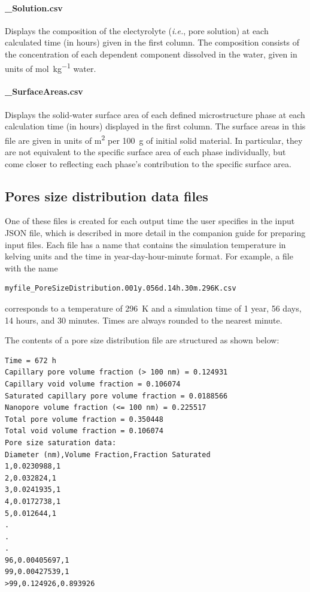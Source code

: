 \documentclass{article}
\begin{document}
\paragraph{\_Solution.csv} Displays the composition of the electyrolyte
(\textit{i.e.}, pore solution) at each calculated time (in hours) given in
the first column. The composition consists of the concentration of each
dependent component dissolved in the water, given in units of
\unit{\mole\per\kilo\gram} water.

\paragraph{\_SurfaceAreas.csv} Displays the solid-water surface
area of each defined microstructure phase at each calculation time (in hours)
displayed in the first column. The surface areas in this file are given
in units of \unit{\meter\squared} per \qty{100}{\gram} of initial solid
material. In particular, they are not equivalent to the specific surface
area of each phase individually, but come closer to reflecting each phase's
contribution to the specific surface area.

\subsection{Pores size distribution data files}
One of these files is created for each output time the user specifies in the
input JSON file, which is described in more detail in the companion guide
for preparing input files. Each file has a name that contains the
simulation temperature in kelving units and the time in year-day-hour-minute format.
For example, a file with the name
\scriptsize{
	\begin{lstlisting}
myfile_PoreSizeDistribution.001y.056d.14h.30m.296K.csv
\end{lstlisting}
}
\normalsize{ }
corresponds to a temperature of \qty{296}{\kelvin} and
a simulation time of 1 year, 56 days, 14 hours, and 30 minutes.
Times are always rounded to the nearest minute.

The contents of a pore size distribution file are structured
as shown below:
\scriptsize{
	\begin{lstlisting}
Time = 672 h
Capillary pore volume fraction (> 100 nm) = 0.124931
Capillary void volume fraction = 0.106074
Saturated capillary pore volume fraction = 0.0188566
Nanopore volume fraction (<= 100 nm) = 0.225517
Total pore volume fraction = 0.350448
Total void volume fraction = 0.106074
Pore size saturation data:
Diameter (nm),Volume Fraction,Fraction Saturated
1,0.0230988,1
2,0.032824,1
3,0.0241935,1
4,0.0172738,1
5,0.012644,1
.
.
.
96,0.00405697,1
99,0.00427539,1
>99,0.124926,0.893926
\end{lstlisting}
}
\end{document}
